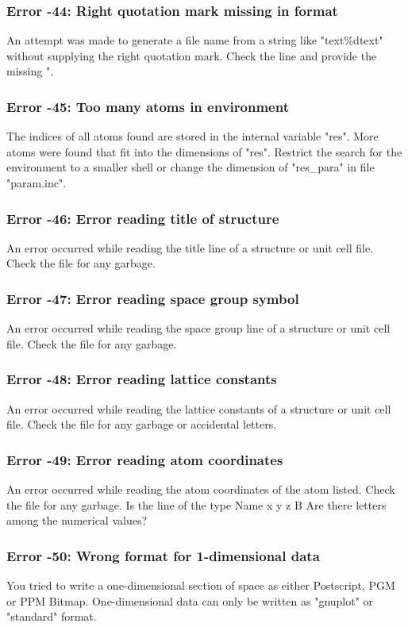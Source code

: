 \subsubsection{Error -44: Right quotation mark missing in format}
\par
An attempt was made to generate a file name from a string like 
"text\%dtext" without supplying the right quotation mark. 
Check the line and provide the missing ". 
\subsubsection{Error -45: Too many atoms in environment}
\par
The indices of all atoms found are stored in the internal variable 
"res". More atoms were found that fit into the dimensions of "res". 
Restrict the search for the environment to a smaller shell or 
change the dimension of "res\_para" in file "param.inc". 
\subsubsection{Error -46: Error reading title of structure}
\par
An error occurred while reading the title line of a structure or 
unit cell file. Check the file for any garbage. 
\subsubsection{Error -47: Error reading space group symbol}
\par
An error occurred while reading the space group  line of a structure or 
unit cell file. Check the file for any garbage. 
\subsubsection{Error -48: Error reading lattice constants}
\par
An error occurred while reading the lattice constants of a structure 
or unit cell file. Check the file for any garbage or accidental letters. 
\subsubsection{Error -49: Error reading atom coordinates}
\par
An error occurred while reading the atom coordinates of the atom 
listed.  Check the file for any garbage. Is the line of the type 
Name x y z B 
Are there letters among the numerical values? 
\subsubsection{Error -50: Wrong format for 1-dimensional data}
\par
You tried to write a one-dimensional section of space as either 
Postscript, PGM or PPM Bitmap. One-dimensional data can only be 
written as "gnuplot" or "standard" format. 
